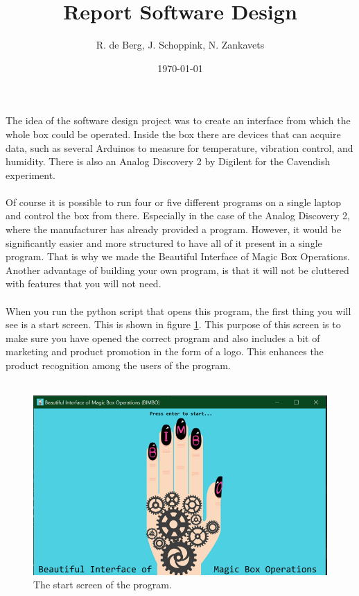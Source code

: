 \documentclass[a4paper]{article}
\begin{document}
	
\title{Report Software Design}

\author{R. de Berg, J. Schoppink, N. Zankavets}

\date{\today}

\maketitle
The idea of the software design project was to create an interface from which the whole box could be operated. Inside the box there are devices that can acquire data, such as several Arduinos to measure for temperature, vibration control, and humidity. There is also an Analog Discovery 2 by Digilent for the Cavendish experiment. \\\\
\indent Of course it is possible to run four or five different programs on a single laptop and control the box from there. Especially in the case of the Analog Discovery 2, where the manufacturer has already provided a program. However, it would be significantly easier and more structured to have all of it present in a single program. That is why we made the Beautiful Interface of Magic Box Operations. Another advantage of building your own program, is that it will not be cluttered with features that you will not need.\\\\
\indent When you run the python script that opens this program, the first thing you will see is a start screen. This is shown in figure \ref{fig1}. This purpose of this screen is to make sure you have opened the correct program and also includes a bit of marketing and product promotion in the form of a logo. This enhances the product recognition among the users of the program. \\\\

\begin{figure}[]
	\centering
	\includegraphics[width=0.7 \textwidth]{startscreen.png}
	\caption{\label{fig1} The start screen of the program.}
\end{figure}
\end{document}
